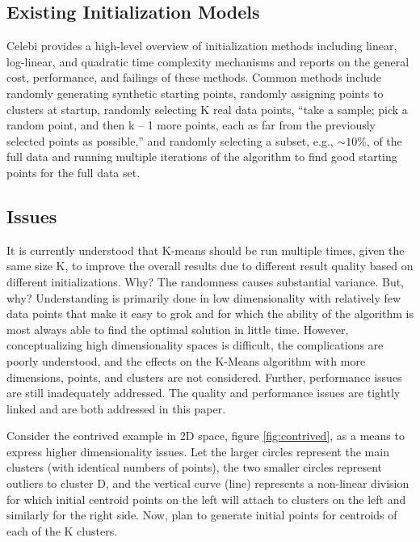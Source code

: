 \documentclass{article}
\begin{document}
\subsection{Existing Initialization Models}

Celebi provides a high-level overview of initialization methods including linear, log-linear, and quadratic time complexity mechanisms and reports on the general cost, performance, and failings of these methods.\cite{celebi}  Common methods include randomly generating synthetic starting points,\cite{ng}\cite{yse} randomly assigning points to clusters at startup,\cite{forgy} randomly selecting K real data points,\cite{macqueen} “take a sample; pick a random point, and then k – 1 more points, each as far from the previously selected points as possible,”\cite{leskovec} and randomly selecting a subset, e.g., $\sim$$10\%$, of the full data and running multiple iterations of the algorithm to find good starting points for the full data set.\cite{bradley}

\subsection{Issues}

It is currently understood that K-means should be run multiple times, given the same size K, to improve the overall results due to different result quality based on different initializations.  Why?  The randomness causes substantial variance.  But, why?  Understanding is primarily done in low dimensionality with relatively few data points that make it easy to grok and for which the ability of the algorithm is most always able to find the optimal solution in little time.  However, conceptualizing high dimensionality spaces is difficult, the complications are poorly understood, and the effects on the K-Means algorithm with more dimensions, points, and clusters are not considered.  Further, performance issues are still inadequately addressed.  The quality and performance issues are tightly linked and are both addressed in this paper.

Consider the contrived example in 2D space, figure \ref{fig:contrived}, as a means to express higher dimensionality issues.  Let the larger circles represent the main clusters (with identical numbers of points), the two smaller circles represent outliers to cluster D, and the vertical curve (line) represents a non-linear division for which initial centroid points on the left will attach to clusters on the left and similarly for the right side.  Now, plan to generate initial points for centroids of each of the K clusters.
\end{document}
